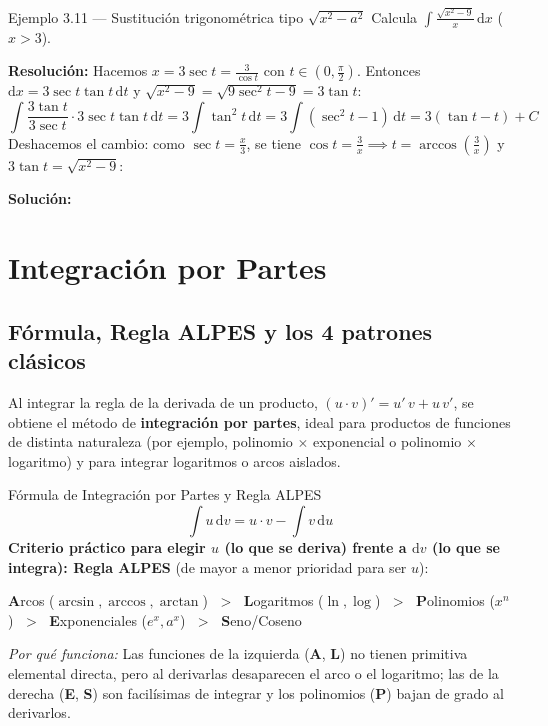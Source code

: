 \documentclass[10pt,a4paper]{article}
\newcommand{\minspace}[1]{\par\ifdim\dimexpr\pagegoal-\pagetotal\relax<#1\newpage\fi}
\newcommand{\sol}[1]{\par\smallskip\noindent\textbf{Solución:} \fcolorbox{mainblue}{softblue}{$\displaystyle #1$}}
\begin{document}
\begin{ejemplobox}{Ejemplo 3.11 --- Sustitución trigonométrica tipo $\sqrt{x^2 - a^2}$}
Calcula $\displaystyle \int \frac{\sqrt{x^2 - 9}}{x}\,\mathrm{d}x$ \quad ($x > 3$).
\par\textbf{Resolución:} Hacemos $x = 3\sec t = \frac{3}{\cos t}$ con $t \in (0, \frac{\pi}{2})$. Entonces $\mathrm{d}x = 3\sec t\tan t\,\mathrm{d}t$ y $\sqrt{x^2 - 9} = \sqrt{9\sec^2 t - 9} = 3\tan t$:
$$\int \frac{3\tan t}{3\sec t}\cdot 3\sec t\tan t\,\mathrm{d}t = 3\int \tan^2 t\,\mathrm{d}t = 3\int (\sec^2 t - 1)\,\mathrm{d}t = 3(\tan t - t) + C$$
Deshacemos el cambio: como $\sec t = \frac{x}{3}$, se tiene $\cos t = \frac{3}{x} \implies t = \arccos\!\left(\frac{3}{x}\right)$ y $3\tan t = \sqrt{x^2 - 9}$:
\sol{\sqrt{x^2 - 9} - 3\arccos\!\left(\frac{3}{x}\right) + C}
\end{ejemplobox}

\minspace{6.5cm}

\section{Integración por Partes}

\subsection{Fórmula, Regla ALPES y los 4 patrones clásicos}

Al integrar la regla de la derivada de un producto, $(u\cdot v)' = u'\,v + u\,v'$, se obtiene el método de \textbf{integración por partes}, ideal para productos de funciones de distinta naturaleza (por ejemplo, polinomio $\times$ exponencial o polinomio $\times$ logaritmo) y para integrar logaritmos o arcos aislados.

\begin{formulabox}{Fórmula de Integración por Partes y Regla ALPES}
$$\int u\,\mathrm{d}v = u\cdot v - \int v\,\mathrm{d}u$$
\textbf{Criterio práctico para elegir $u$ (lo que se deriva) frente a $\mathrm{d}v$ (lo que se integra): Regla ALPES} (de mayor a menor prioridad para ser $u$):
\begin{center}
\textbf{A}rcos ($\arcsin, \arccos, \arctan$) $\;>\;$ \textbf{L}ogaritmos ($\ln, \log$) $\;>\;$ \textbf{P}olinomios ($x^n$) $\;>\;$ \textbf{E}xponenciales ($e^x, a^x$) $\;>\;$ \textbf{S}eno/Coseno
\end{center}
\textit{Por qué funciona:} Las funciones de la izquierda (\textbf{A}, \textbf{L}) no tienen primitiva elemental directa, pero al derivarlas desaparecen el arco o el logaritmo; las de la derecha (\textbf{E}, \textbf{S}) son facilísimas de integrar y los polinomios (\textbf{P}) bajan de grado al derivarlos.
\end{formulabox}
\end{document}
